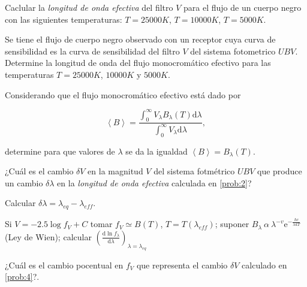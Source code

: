 \documentclass[12pt,a4paper]{practice}
\begin{document}
    \begin{problem}\label{prob:2}
        Caclular la \emph{longitud de onda efectiva} del filtro $V$ para el flujo de un cuerpo negro con las siguientes temperaturas: $T = 25000 K$, $T = 10000 K$, $T = 5000 K$.
    \end{problem}

    \begin{problem}\label{prob:3}
        Se tiene el flujo de cuerpo negro observado con un receptor cuya curva de sensibilidad es la curva de sensibilidad del filtro $V$ del sistema fotometrico $UBV$. Determine la longitud de onda del flujo monocromático efectivo para las temperaturas $T = 25000 K$, $10000 K$ y $5000 K$.

        \begin{recommendation}
            Considerando que el flujo monocromático efectivo está dado por

                $$\left\langle B\right\rangle = \frac{\displaystyle{\int_{0}^{\infty} V_{\lambda} B_{\lambda} \left(T\right) \mathrm{d}\lambda}}{\displaystyle{\int_{0}^{\infty} V_{\lambda} \mathrm{d}\lambda}},$$

            determine para que valores de $\lambda$ se da la igualdad $\left\langle B\right\rangle = B_{\lambda} \left(T\right)$.
        \end{recommendation}
    \end{problem}

    \begin{problem}\label{prob:4}
        ¿Cuál es el cambio $\delta V$ en la magnitud $V$ del sistema fotmétrico $UBV$ que produce un cambio $\delta\lambda$ en la \emph{longitud de onda efectiva} calculada en \ref{prob:2}?

        Calcular $\delta\lambda = {\lambda}_{eq} - {\lambda}_{eff}$.

        \begin{recommendation}
            Si $V = -2.5 \log f_V + C$ tomar $f_V \simeq B\left(T\right) $, $T=T\left({\lambda}_{eff}\right)$; suponer $B_{\lambda}\ \alpha\ {\lambda}^{-v} \mathrm{e}^{-\frac{hc}{\lambda k T}}$ (Ley de Wien); calcular $\left(\frac{\mathrm{d} \ln {f}_{\lambda}}{\mathrm{d}\lambda}\right)_{\lambda = {\lambda}_{eq}}$
        \end{recommendation}
    \end{problem}

    \begin{problem}\label{prob:5}
        ¿Cuál es el cambio pocentual en $f_V$ que representa el cambio $\delta V$ calculado en \ref{prob:4}?.
    \end{problem}
\end{document}
